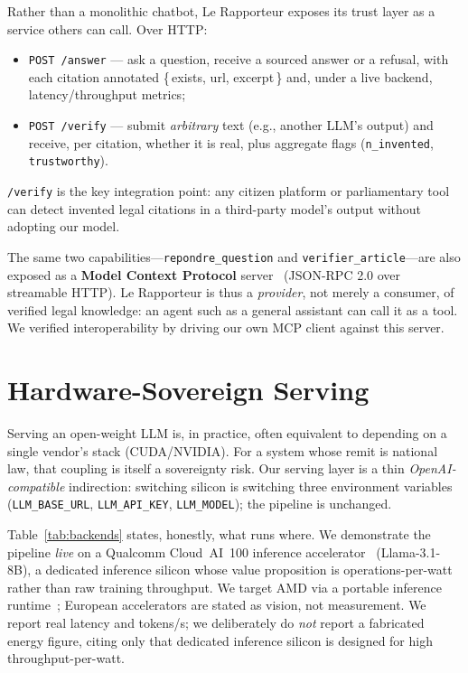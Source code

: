 \documentclass[sigconf, nonacm]{acmart}
\begin{document}
Rather than a monolithic chatbot, Le Rapporteur exposes its trust layer as a
service others can call. Over HTTP:
\begin{itemize}
  \item \texttt{POST /answer} --- ask a question, receive a sourced answer or a
  refusal, with each citation annotated \{\,exists, url, excerpt\,\} and,
  under a live backend, latency/throughput metrics;
  \item \texttt{POST /verify} --- submit \emph{arbitrary} text (e.g., another
  LLM's output) and receive, per citation, whether it is real, plus aggregate
  flags (\texttt{n\_invented}, \texttt{trustworthy}).
\end{itemize}
\texttt{/verify} is the key integration point: any citizen platform or
parliamentary tool can detect invented legal citations in a third-party model's
output without adopting our model.

The same two capabilities---\texttt{repondre\_question} and
\texttt{verifier\_article}---are also exposed as a \textbf{Model Context
Protocol} server~\cite{mcp2024} (JSON-RPC 2.0 over streamable HTTP). Le
Rapporteur is thus a \emph{provider}, not merely a consumer, of verified legal
knowledge: an agent such as a general assistant can call it as a tool. We
verified interoperability by driving our own MCP client against this server.

\section{Hardware-Sovereign Serving}
\label{sec:sovereign}

Serving an open-weight LLM is, in practice, often equivalent to depending on a
single vendor's stack (CUDA/NVIDIA). For a system whose remit is national law,
that coupling is itself a sovereignty risk. Our serving layer is a thin
\emph{OpenAI-compatible} indirection: switching silicon is switching three
environment variables (\texttt{LLM\_BASE\_URL}, \texttt{LLM\_API\_KEY},
\texttt{LLM\_MODEL}); the pipeline is unchanged.

Table~\ref{tab:backends} states, honestly, what runs where. We demonstrate the
pipeline \emph{live} on a Qualcomm Cloud~AI~100 inference
accelerator~\cite{qualcommcloudai100} (Llama-3.1-8B), a dedicated
inference silicon whose value proposition is operations-per-watt rather than
raw training throughput. We target AMD via a portable inference
runtime~\cite{modularmax2024}; European accelerators are stated as vision, not
measurement. We report real latency and tokens/s; we deliberately do
\emph{not} report a fabricated energy figure, citing only that dedicated
inference silicon is designed for high throughput-per-watt.
\end{document}
